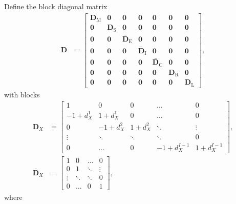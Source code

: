 \documentclass[12pt]{article}
\newcommand{\mat}[1]{\mathbf{#1}}
\begin{document}
Define the block diagonal matrix
\begin{align}
  \mat{D} &=
  \begin{bmatrix}
    \mat{D}_{\mathrm{M}} & \mat{0} & \mat{0} &
    \mat{0} & \mat{0} & \mat{0} & \mat{0}
    \\
    \mat{0} & \mat{D}_{\mathrm{S}} & \mat{0} &
    \mat{0} & \mat{0} & \mat{0} & \mat{0}
    \\
    \mat{0} & \mat{0} & \bar{\mat{D}}_{\mathrm{E}} &
    \mat{0} & \mat{0} & \mat{0} & \mat{0}
    \\
    \mat{0} & \mat{0} & \mat{0} &
    \bar{\mat{D}}_{\mathrm{I}} & \mat{0} & \mat{0} & \mat{0}
    \\
    \mat{0} & \mat{0} & \mat{0} & \mat{0} &
    \bar{\mat{D}}_{\mathrm{C}} & \mat{0} & \mat{0}
    \\
    \mat{0} & \mat{0} & \mat{0} & \mat{0} &
    \mat{0} & \mat{D}_{\mathrm{R}} & \mat{0}
    \\
    \mat{0} & \mat{0} & \mat{0} & \mat{0} &
    \mat{0} & \mat{0} & \mat{D}_{\mathrm{L}}
  \end{bmatrix},
\end{align}
with blocks
\begin{subequations}
  \begin{align}
    \mat{D}_X &=
    \begin{bmatrix}
      1 & 0 & 0 & \hdots & 0
      \\
      - 1 + d_X^1 & 1 + d_X^1 & 0 & \hdots & 0
      \\
      0 & - 1 + d_X^2 & 1 + d_X^2 & \ddots & \vdots
      \\
      \vdots & \ddots & \ddots & \ddots & 0
      \\
      0 & \hdots & 0 & - 1 + d_X^{I - 1} & 1 + d_X^{I - 1}
    \end{bmatrix},
    \\
    \bar{\mat{D}}_X &=
    \begin{bmatrix}
      1 & 0 & \hdots & 0 \\
      0 & 1 & \ddots & \vdots \\
      \vdots & \ddots & \ddots & 0 \\
      0 & \hdots & 0 & 1
    \end{bmatrix},
  \end{align}
\end{subequations}
where
\end{document}

